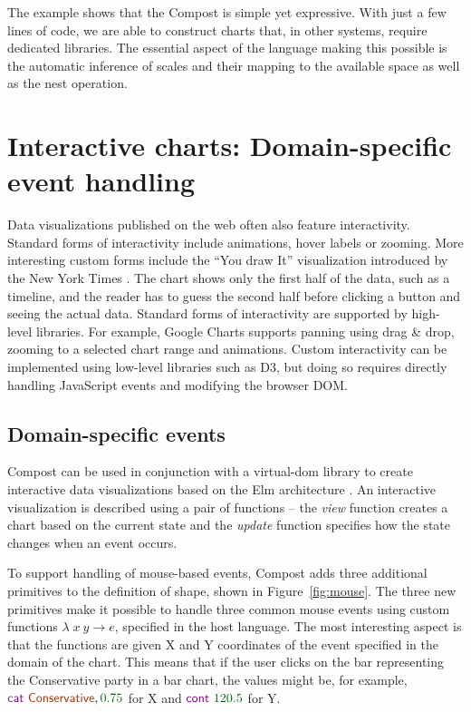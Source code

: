 \documentclass{jfp}
\newcommand{\num}[1]{\textcolor{numclr}{#1}}
\newcommand{\strf}[1]{\textnormal{\textcolor{strclr}{\sffamily #1}}}
\newcommand{\kvd}[1]{\textnormal{\textcolor{kvdclr}{\sffamily #1}}}
\begin{document}
The example shows that the Compost is simple yet expressive. With just
a few lines of code, we are able to construct charts that, in other systems, require dedicated
libraries. The essential aspect of the language making this possible is the automatic inference
of scales and their mapping to the available space as well as the \kvd{nest} operation.


\section{Interactive charts: Domain-specific event handling}
Data visualizations published on the web often also feature interactivity. Standard forms of
interactivity include animations, hover labels or zooming. More interesting custom forms
include the ``You draw It'' visualization introduced by the New York Times \cite{youdraw}.
The chart shows only the first half of the data, such as a timeline, and the reader has to
guess the second half before clicking a button and seeing the actual data. Standard forms of
interactivity are supported by high-level libraries. For example, Google Charts supports panning
using drag \& drop, zooming to a selected chart range and animations. Custom interactivity can be
implemented using low-level libraries such as D3, but doing so requires directly handling
JavaScript events and modifying the browser DOM.

\subsection{Domain-specific events}
Compost can be used in conjunction with a virtual-dom library to create interactive data
visualizations based on the Elm architecture \cite{mvu}. An interactive visualization is described using
a pair of functions -- the \emph{view} function creates a chart based on the current state and
the \emph{update} function specifies how the state changes when an event occurs.

To support handling of mouse-based events, Compost adds three additional primitives to the definition
of shape, shown in Figure~\ref{fig:mouse}. The three new primitives make it possible to handle
three common mouse events using custom functions $\lambda \;x~y\rightarrow e$, specified in the
host language. The most interesting aspect is that the functions are given X and Y coordinates
of the event specified in the domain of the chart. This means that if the user clicks on the
bar representing the Conservative party in a bar chart, the values might be, for example,
$\kvd{cat}~\strf{Conservative},\num{0.75}$ for X and $\kvd{cont}~\num{120.5}$ for Y.
\end{document}
